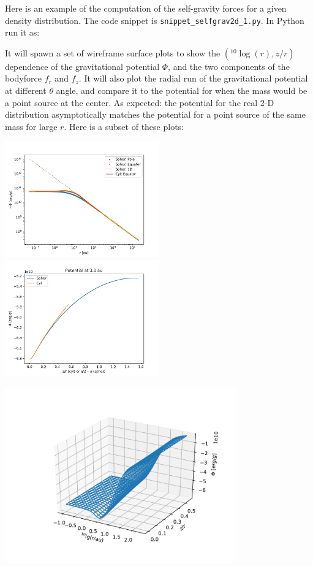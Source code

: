 \documentclass{book}
\newcommand{\code}[1]{{\small\tt #1}}
\begin{document}
Here is an example of the computation of the self-gravity forces for a
given density distribution. The code snippet is
\code{snippet\_selfgrav2d\_1.py}. In Python run it as:
\begin{codebox}
\end{codebox}
It will spawn a set of wireframe surface plots to show the $(^{10}\log(r),z/r)$
dependence of the gravitational potential $\Phi$, and the two components of the
bodyforce $f_r$ and $f_z$. It will also plot the radial run of the gravitational
potential at different $\theta$ angle, and compare it to the potential
for when the mass would be a point source at the center. As expected:
the potential for the real 2-D distribution asymptotically matches the
potential for a point source of the same mass for large $r$. Here is a subset
of these plots:

\centerline{
  \includegraphics[width=0.5\textwidth]{../snippets/fig_snippet_selfgrav2d_1_1.pdf}
  \includegraphics[width=0.5\textwidth]{../snippets/fig_snippet_selfgrav2d_1_2.pdf}}

\centerline{
  \includegraphics[width=0.75\textwidth]{../snippets/fig_snippet_selfgrav2d_1_4.pdf}}
\end{document}
